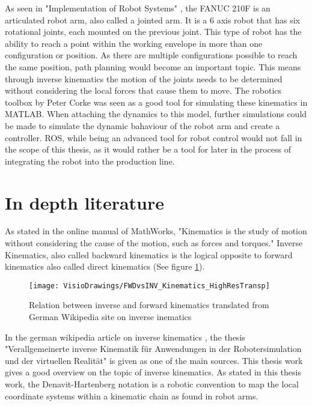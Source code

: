 As seen in "Implementation of Robot Systems" \cite{IndustrialRobotArm}, the FANUC 210F is an articulated robot arm, also called a jointed arm. It is a 6 axis robot that has six rotational joints, each mounted on
the previous joint. This type of robot has the ability to reach a point within the working envelope in more than one configuration or position. 
As there are multiple configurations possible to reach the same position, path planning would become an important topic. 
This means through inverse kinematics  the motion of the joints needs to be determined without considering the local forces that cause them to move.
The robotics toolbox by Peter Corke was seen as a good tool for simulating these kinematics in MATLAB. 
When attaching the dynamics to this model, further simulations could be made to simulate the dynamic bahaviour of the robot arm and create a controller. %
ROS, while being an advanced tool for robot control would not fall in the scope of this thesis, as it would rather be a tool for later in the process of integrating the robot into the production line.\\
\medskip

\section{In depth literature}

As stated in the online manual of MathWorks, "Kinematics is the study of motion without considering the cause of the motion, such as forces and torques." \cite{MathWorksInverseKinematics}
Inverse Kinematics, also called backward kinematics is the logical opposite to forward kinematics also called direct kinematics (See figure \ref{fig:FwVsInvKin}). 


\begin{figure}[H]
	\texttt{[image: VisioDrawings/FWDvsINV\_Kinematics\_HighResTransp]}
	\caption{Relation between inverse and forward kinematics translated from German Wikipedia site on inverse inematics \cite{forwardVsInverseKinematics}}
	\label{fig:FwVsInvKin}
\end{figure}

In the german wikipedia article on inverse kinematics \cite{inverseKinematikWiki}, the thesis "Verallgemeinerte inverse Kinematik für Anwendungen in der Robotersimulation und der virtuellen Realität" \cite{allgInvKin} is given as one of the main sources. 
This thesis work gives a good overview on the topic of inverse kinematics. 
As stated in this thesis work, the Denavit-Hartenberg notation is a robotic convention to map the local coordinate systems within a kinematic chain as found in robot arms.

